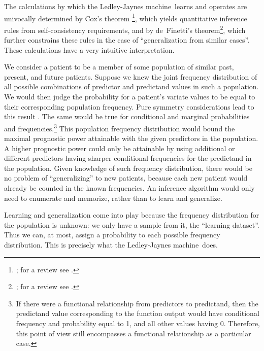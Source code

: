 \documentclass[utf8]{FrontiersinHarvard} %
\newcommand*{\sects}{\S\S}%
\renewcommand*{\|}[1][]{\nonscript\:#1\vert\nonscript\:\mathopen{}}
\newcommand*{\ljm}{Ledley-Jaynes machine}
\begin{document}
The calculations by which the \ljm\ learns and operates are univocally determined by Cox's theorem \footnote{\citealp{cox1946,cox1961,polya1954,polya1954b_r1968,tribus1969,fine1973,rosenkrantz1977,paris1994_r2006,snow1998,arnborgetal2001,snow2001,claytonetal2017}; for a review see \citealp{vanhorn2003}.}, which yields quantitative inference rules from self-consistency requirements, and by de~Finetti's theorem\footnote{\citealp[\sects~4.2--4.3]{definetti1930,definetti1937,bernardoetal1994_r2000}; for a review see \citealp{dawid2013}.}, which further constrains these rules in the case of \enquote{generalization from similar cases}. These calculations have a very intuitive interpretation.

We consider a patient to be a member of some population of similar past, present, and future patients. Suppose we knew the joint frequency distribution of all possible combinations of predictor and predictand values in such a population. We would then judge the probability for a patient's variate values to be equal to their corresponding population frequency. Pure symmetry considerations lead to this result \citep[\sects~4.2--4.3]{definetti1930,dawid2013,bernardoetal1994_r2000}. The same would be true for conditional and marginal probabilities and frequencies.\footnote{If there were a functional relationship from predictors to predictand, then the predictand value corresponding to the function output would have conditional frequency and probability equal to 1, and all other values having 0. Therefore, this point of view still encompasses a functional relationship as a particular case.} This population frequency distribution would bound the maximal prognostic power attainable with the given predictors in the population. A higher prognostic power could only be attainable by using additional or different predictors having sharper conditional frequencies for the predictand in the population. Given knowledge of such frequency distribution, there would be no problem of \enquote{generalizing} to new patients, because each new patient would already be counted in the known frequencies. An inference algorithm would only need to enumerate and memorize, rather than to learn and generalize.

Learning and generalization come into play because the frequency distribution for the population is unknown: we only have a sample from it, the \enquote{learning dataset}. Thus we can, at most, assign a probability to each possible frequency distribution. This is precisely what the \ljm\ does.
\end{document}
